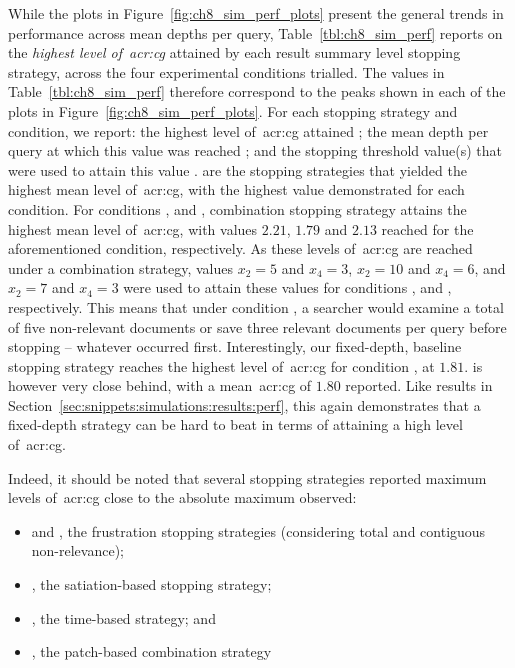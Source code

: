 While the plots in Figure~\ref{fig:ch8_sim_perf_plots} present the general trends in performance across mean depths per query, Table~\ref{tbl:ch8_sim_perf} reports on the \emph{highest level of~\gls{acr:cg}} attained by each result summary level stopping strategy, across the four experimental conditions trialled. The values in Table~\ref{tbl:ch8_sim_perf} therefore correspond to the peaks shown in each of the plots in Figure~\ref{fig:ch8_sim_perf_plots}. For each stopping strategy and condition, we report: the highest level of~\gls{acr:cg} attained ; the mean depth per query at which this value was reached ; and the stopping threshold value(s) that were used to attain this value .  are the stopping strategies that yielded the highest mean level of~\gls{acr:cg}, with the highest value demonstrated for each condition. For conditions ,  and , combination stopping strategy  attains the highest mean level of~\gls{acr:cg}, with values $2.21$, $1.79$ and $2.13$ reached for the aforementioned condition, respectively. As these levels of~\gls{acr:cg} are reached under a combination strategy, values $x_2=5$ and $x_4=3$, $x_2=10$ and $x_4=6$, and $x_2=7$ and $x_4=3$ were used to attain these values for conditions ,  and , respectively. This means that under condition , a searcher would examine a total of five non-relevant documents or save three relevant documents per query before stopping -- whatever occurred first. Interestingly, our fixed-depth, baseline stopping strategy  reaches the highest level of~\gls{acr:cg} for condition , at $1.81$.  is however very close behind, with a mean~\gls{acr:cg} of $1.80$ reported. Like results in Section~\ref{sec:snippets:simulations:results:perf}, this again demonstrates that a fixed-depth strategy can be hard to beat in terms of attaining a high level of~\gls{acr:cg}.

Indeed, it should be noted that several stopping strategies reported maximum levels of~\gls{acr:cg} close to the absolute maximum observed:

\begin{itemize}
    
    \item{ and , the frustration stopping strategies (considering total and contiguous non-relevance);}
    \item{, the satiation-based stopping strategy;}
    \item{, the time-based strategy; and}
    \item{, the patch-based combination strategy}
    
\end{itemize}

